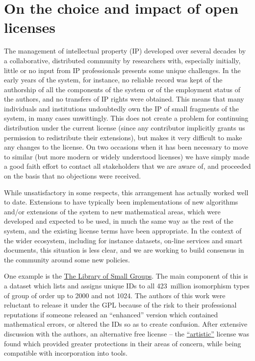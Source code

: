 \documentclass{deliverablereport}
\begin{document}

\section{On the choice and impact of open licenses}


The management of intellectual property (IP) developed over several
decades
by a collaborative, distributed community by researchers with,
especially initially, little or no input from IP professionals
presents some unique challenges. In the early years of the \GAP
system, for instance, no reliable record was kept of the authorship of
all the components of the system or of the employment status of the
authors, and no transfers of IP rights were obtained. This means that
many individuals and institutions undoubtedly own the IP of small
fragments of the system, in many cases unwittingly.
This does not create a problem for continuing
distribution under the current license (since any contributor
implicitly grants us permission to redistribute their
extensions), but makes it very difficult to make any changes to the
license. On two occasions when it has been necessary to move to
similar (but more modern or widely understood licenses) we have simply
made a good faith effort to contact all stakeholders that we are aware
of, and proceeded on the basis that no objections were received.

While unsatisfactory in some respects, this arrangement has actually
worked well to date. Extensions to \GAP have typically been
implementations of new algorithms and/or extensions of the system to
new mathematical areas, which were developed and expected to be used,
in much the same way as the rest of the system, and the existing
license terms have been appropriate. In the context of the wider \ODK
ecosystem, including for instance datasets, on-line services and smart
documents, this situation is less clear, and we are working to build
consensus in the \GAP community around some new policies.

One example is the \href{https://www.gap-system.org/Packages/smallgrp.html}{The Library of Small Groups}. The main
component of this is a dataset which lists and assigns unique IDs to
all 423~million isomorphism types of group of
order up to 2000 and not 1024. The
authors of this work were reluctant to release it under the GPL
because of the risk to their professional reputations if someone
released an ``enhanced'' version which contained mathematical errors,
or altered the IDs so as to create confusion. After extensive
discussion with the authors, an alternative free license -- the
\href{https://opensource.org/licenses/Artistic-2.0}{``artistic''} license was found which provided greater
protections in their areas of concern, while being compatible with
incorporation into \ODK tools.
\end{document}
